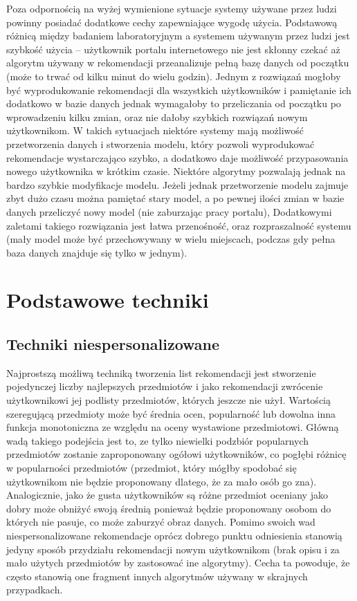 \documentclass{pracamgr}
\begin{document}
   Poza odpornością na wyżej wymienione sytuacje systemy używane przez ludzi powinny posiadać dodatkowe cechy zapewniające wygodę użycia.
   Podstawową różnicą między badaniem laboratoryjnym a systemem używanym przez ludzi jest szybkość użycia --
   użytkownik portalu internetowego nie jest skłonny czekać aż algorytm używany w rekomendacji przeanalizuje pełną bazę danych od początku
   (może to trwać od kilku minut do wielu godzin).
   Jednym z rozwiązań mogłoby być wyprodukowanie rekomendacji dla wszystkich użytkowników i pamiętanie ich dodatkowo w bazie danych
   jednak wymagałoby to przeliczania od początku po wprowadzeniu kilku zmian, oraz nie dałoby szybkich rozwiązań nowym użytkownikom.
   W takich sytuacjach niektóre systemy mają możliwość przetworzenia danych i stworzenia modelu,
   który pozwoli wyprodukować rekomendacje wystarczająco szybko, a dodatkowo daje możliwość przypasowania nowego użytkownika w krótkim czasie.
   Niektóre algorytmy pozwalają jednak na bardzo szybkie modyfikacje modelu.
   Jeżeli jednak przetworzenie modelu zajmuje zbyt dużo czasu można pamiętać stary model,
   a po pewnej ilości zmian w bazie danych przeliczyć nowy model (nie zaburzając pracy portalu),
   Dodatkowymi zaletami takiego rozwiązania jest łatwa przenośność, oraz rozpraszalność systemu (mały model może być przechowywany w wielu miejscach,
   podczas gdy pełna baza danych znajduje się tylko w jednym).

 \chapter{Podstawowe techniki}
  \section{Techniki niespersonalizowane}
   Najprostszą możliwą techniką tworzenia list rekomendacji jest stworzenie pojedynczej liczby najlepszych przedmiotów
   i jako rekomendacji zwrócenie użytkownikowi jej podlisty przedmiotów, których jeszcze nie użył.
   Wartością szeregującą przedmioty może być średnia ocen, popularność lub dowolna inna funkcja monotoniczna ze względu na oceny wystawione przedmiotowi.
   Główną wadą takiego podejścia jest to, ze tylko niewielki podzbiór popularnych przedmiotów zostanie zaproponowany ogółowi użytkowników,
   co pogłębi różnicę w popularności przedmiotów (przedmiot, który mógłby spodobać się użytkownikom nie będzie proponowany dlatego, że za mało osób go zna).
   Analogicznie, jako że gusta użytkowników są różne przedmiot oceniany jako dobry może obniżyć swoją średnią ponieważ będzie proponowany osobom do których nie pasuje,
   co może zaburzyć obraz danych.\newline
   Pomimo swoich wad niespersonalizowane rekomendacje oprócz dobrego punktu odniesienia stanowią jedyny sposób przydziału rekomendacji nowym użytkownikom
   (brak opisu i za mało użytych przedmiotów by zastosować ine algorytmy).
   Cecha ta powoduje, że często stanowią one fragment innych algorytmów używany w skrajnych przypadkach. 
\end{document}
